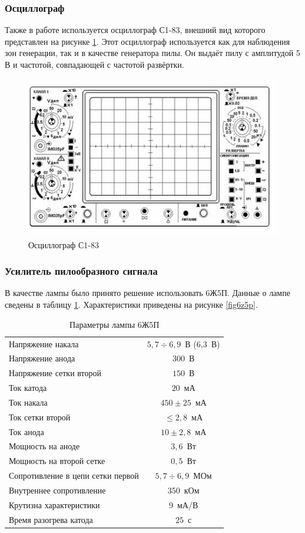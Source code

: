 \documentclass[a4paper,14pt]{extarticle}
\begin{document}
    \subsubsection{Осциллограф}
    Также в работе используется осциллограф С1-83, внешний вид которого представлен на рисунке \ref{figo}. Этот осциллограф используется как для наблюдения зон генерации, так и в качестве генератора пилы. Он выдаёт пилу с амплитудой 5 В и частотой, совпадающей с частотой развёртки.
    \begin{figure}[h]
        \begin{center}
            \includegraphics[width=.5\textwidth]{images/s1-83.jpg}
        \end{center}
        \caption{Осциллограф С1-83}
        \label{figo}
    \end{figure}
    
    \subsubsection{Усилитель пилообразного сигнала}
    
    В качестве лампы было принято решение использовать 6Ж5П. Данные о лампе сведены в таблицу \ref{tab6z5p}. Характеристики приведены на рисунке \ref{fig6z5p}.
    
    \begin{table}[!h]
    	\caption{Параметры лампы 6Ж5П}
    	\label{tab6z5p}
    	\centering
    	\begin{tabular}{|l|c|}
    		\hline
	    	Напряжение накала & $5{,}7\div6{,}9$~В (6,3~В) \\
	    	Напряжение анода & $300$~В \\
	    	Напряжение сетки второй & $150$~В \\
	    	Ток катода & $20$~мА \\
	    	Ток накала & $450\pm25$~мА \\
	    	Ток сетки второй & $\le 2{,}8$~мА \\
	    	Ток анода & $10\pm2{,}8$~мА \\
	    	Мощность на аноде & $3{,}6$~Вт \\
	    	Мощность на второй сетке & $0{,}5$~Вт \\
	    	Сопротивление в цепи сетки первой & $5{,}7\div6{,}9$~МОм \\
	    	Внутреннее сопротивление & 350~кОм \\
	    	Крутизна характеристики & 9~мА/В \\
	    	Время разогрева катода & $25$~с \\
	    	\hline
    	\end{tabular}
    \end{table}
    
\end{document}
